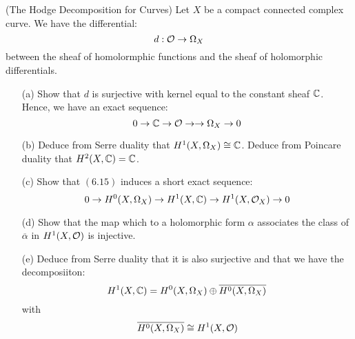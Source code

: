 \documentclass[12pt]{article}
\begin{document}
\begin{problem}{3}(The Hodge Decomposition for Curves)
    Let $X$ be a compact connected complex curve. We have the differential:
    \[d: \mathcal{O} \to \Omega_X\]
    between the sheaf of homolormphic functions and the sheaf of holomorphic differentials.
    \begin{enumerate}
        \item[(a)] Show that $d$ is surjective with kernel equal to the constant sheaf $\mathbb C$. Hence, we have an exact sequence: 
        \[ 0 \to \mathbb C \to \mathcal{O} \rightarrow \to \Omega_X \to 0\]
        \item[(b)] Deduce from Serre duality that $H^1(X, \Omega_X) \cong \mathbb C$. Deduce from Poincare duality that $H^2(X, \mathbb C) = \mathbb C$. 
        \item[(c)] Show that $(6.15)$ induces a short exact sequence: 
        \[ 0 \to H^0(X, \Omega_X) \to H^1(X, \mathbb C) \to H^1(X, \mathcal{O}_X) \to 0\]
        \item[(d)] Show that the map which to a holomorphic form $\alpha$ associates the class of $\overline{\alpha}$ in $H^1(X, \mathcal{O})$ is injective.
        \item[(e)] Deduce from Serre duality that it is also surjective and that we have the decomposiiton: 
        \[ H^1(X, \mathbb C) = H^0(X, \Omega_X) \oplus \overline{H^0(X, \Omega_X)}\]
        with 
        \[ \overline{H^0(X, \Omega_X)} \cong H^1(X, \mathcal{O})\]
    \end{enumerate}

\end{problem}
\begin{solution}
\end{solution}
\newpage
\end{document}
